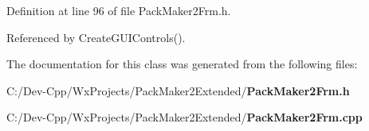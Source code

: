 Definition at line 96 of file Pack\-Maker2Frm.h.

Referenced by Create\-GUIControls().

The documentation for this class was generated from the following files:\begin{CompactItemize}
\item 
C:/Dev-Cpp/Wx\-Projects/Pack\-Maker2Extended/{\bf Pack\-Maker2Frm.h}\item 
C:/Dev-Cpp/Wx\-Projects/Pack\-Maker2Extended/{\bf Pack\-Maker2Frm.cpp}\end{CompactItemize}
